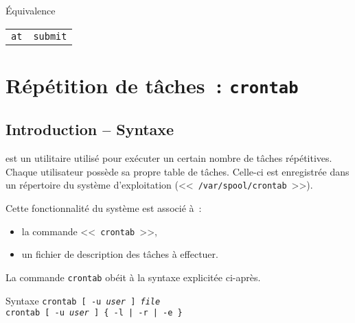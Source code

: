 \begin{definition}{\'{E}quivalence}
\begin{center}
\begin{tabular}{|c|c|}
	\hline
		{\Unix}		&	{\OpenVMS}			\\
	\hline \hline
		{\tt at}		&	{\tt submit}			\\
	\hline
\end{tabular}
\end{center}
\end{definition}

\section{\texorpdfstring{R{\'e}p{\'e}tition de t{\^a}ches~: {\tt crontab}}{R{\'e}p{\'e}tition de t{\^a}ches~: crontab}}

\subsection{Introduction -- Syntaxe}

 est un utilitaire utilis{\'e} pour ex{\'e}cuter un certain nombre de t{\^a}ches
r{\'e}p{\'e}titives. Chaque utilisateur poss{\`e}de sa propre table de t{\^a}ches. Celle-ci est
enregistr{\'e}e dans un r{\'e}pertoire du syst{\`e}me d'exploitation (<<~{\tt /var/spool/crontab}~>>).

Cette fonctionnalit{\'e} du syst{\`e}me est associ{\'e} {\`a}~:
\begin{itemize}
	\item	la commande <<~{\tt crontab}~>>,
	\item	un fichier de description des t{\^a}ches {\`a} effectuer.
\end{itemize}

La commande {\tt crontab} ob{\'e}it {\`a} la syntaxe explicit{\'e}e ci-apr{\`e}s.

\begin{definition}{Syntaxe}
{\tt crontab [ -u {\sl user} ] {\sl file}}\\
{\tt crontab [ -u {\sl user} ] \{ -l | -r | -e \}}
\end{definition}

